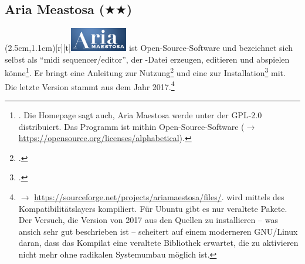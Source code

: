%
%
%



\subsection{Aria Meastosa ($\bigstar$$\bigstar$)}

\parpic(2.5cm,1.1cm)[r][t]{\includegraphics[width=2.5cm]{logos/ariamaestoso-300dpi.png}}
\label{AriaMaestosa} ist Open-Source-Software und bezeichnet
sich selbst als  \enquote{midi sequencer/editor}, der -Datei erzeugen,
editieren und abspielen könne\footnote{\cite[vgl.][\nopage
wp.]{AriaMaestosa2017a}. Die Homepage sagt auch, Aria Maestosa werde unter der
GPL-2.0 distribuiert. Das Programm ist mithin Open-Source-Software ($\rightarrow$
\href{https://opensource.org/licenses/alphabetical}
{https://opensource.org/licenses/alphabetical}).}. Er bringt eine Anleitung zur
Nutzung\footcite[vgl.][\nopage wp.]{AriaMaestosa2017b} und eine zur
Installation\footcite[vgl.][\nopage wp.]{AriaMaestosa2017c} mit. Die letzte
Version stammt aus dem Jahr 2017.\footnote{$\rightarrow$
\href{https://sourceforge.net/projects/ariamaestosa/files/}
{https://sourceforge.net/projects/ariamaestosa/files/}.  wird
mittels des Kompatibilitätslayers  kompiliert. Für Ubuntu gibt es
nur veraltete Pakete. Der Versuch, die Version von 2017 aus den Quellen zu
installieren -- was ansich sehr gut beschrieben ist -- scheitert auf einem
mo\-der\-ne\-ren GNU/Linux daran, dass das Kompilat eine veraltete Bibliothek
erwartet, die zu aktivieren nicht mehr ohne radikalen Systemumbau möglich ist.}

